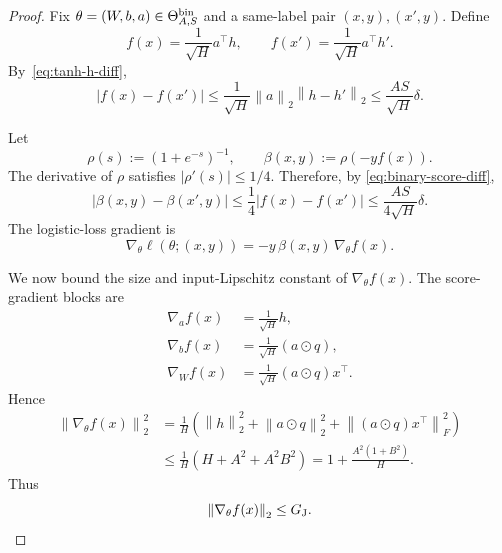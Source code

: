 \documentclass[conference,compsoc]{IEEEtran}
\newcommand{\norm}[1]{\left\lVert #1\right\rVert}
\begin{document}
\begin{proof}
Fix $\theta=(W,b,a)\in\Theta_{A,S}^{\rm bin}$ and a same-label pair
$(x,y),(x',y)$.  Define
\[
f(x)=\frac1{\sqrt H}a^\top h,
\qquad
f(x')=\frac1{\sqrt H}a^\top h'.
\]
By~\eqref{eq:tanh-h-diff},
\begin{equation}
\label{eq:binary-score-diff}
|f(x)-f(x')|
\le
\frac1{\sqrt H}\norm{a}_2\norm{h-h'}_2
\le
\frac{AS}{\sqrt H}\delta.
\end{equation}

Let
\[
\rho(s):=(1+e^{-s})^{-1},
\qquad
\beta(x,y):=\rho(-yf(x)).
\]
The derivative of $\rho$ satisfies $|\rho'(s)|\le1/4$.  Therefore, by
\eqref{eq:binary-score-diff},
\begin{equation}
\label{eq:binary-beta-diff}
|\beta(x,y)-\beta(x',y)|
\le
\frac14|f(x)-f(x')|
\le
\frac{AS}{4\sqrt H}\delta.
\end{equation}
The logistic-loss gradient is
\begin{equation}
\label{eq:binary-loss-gradient-factorization}
\nabla_\theta\ell(\theta;(x,y))
=
-y\,\beta(x,y)\,\nabla_\theta f(x).
\end{equation}

We now bound the size and input-Lipschitz constant of $\nabla_\theta f(x)$.
The score-gradient blocks are
\begin{align*}
\nabla_a f(x)&=\frac1{\sqrt H}h,\\
\nabla_b f(x)&=\frac1{\sqrt H}(a\odot q),\\
\nabla_W f(x)&=\frac1{\sqrt H}(a\odot q)x^\top.
\end{align*}
Hence
\begin{align*}
\norm{\nabla_\theta f(x)}_2^2
&=
\frac1H\left(
\norm{h}_2^2+
\norm{a\odot q}_2^2+
\norm{(a\odot q)x^\top}_F^2
\right)\\
&\le
\frac1H\left(H+A^2+A^2B^2\right)
=
1+\frac{A^2(1+B^2)}H.
\end{align*}
Thus
\begin{equation}
\label{eq:binary-GJ-bound}
\norm{\nabla_\theta f(x)}_2\le G_{\rm J}.
\end{equation}


\end{proof}
\end{document}
